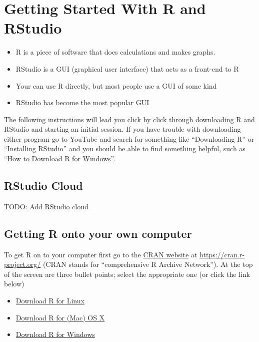 \documentclass[
]{book}
\providecommand{\tightlist}{%
  \setlength{\itemsep}{0pt}\setlength{\parskip}{0pt}}
\begin{document}
\hypertarget{getting-started-with-r-and-rstudio}{%
\section{Getting Started With R and RStudio}\label{getting-started-with-r-and-rstudio}}

\begin{itemize}
\tightlist
\item
  R is a piece of software that does calculations and makes graphs.
\item
  RStudio is a GUI (graphical user interface) that acts as a front-end to R
\item
  Your can use R directly, but most people use a GUI of some kind
\item
  RStudio has become the most popular GUI
\end{itemize}

The following instructions will lead you click by click through downloading R and RStudio and starting an initial session. If you have trouble with downloading either program go to YouTube and search for something like ``Downloading R'' or ``Installing RStudio'' and you should be able to find something helpful, such as \href{https://www.youtube.com/watch?v=GYdmkLgV9n8}{``How to Download R for Windows''}.

\hypertarget{rstudio-cloud}{%
\subsection{RStudio Cloud}\label{rstudio-cloud}}

TODO: Add RStudio cloud

\hypertarget{getting-r-onto-your-own-computer}{%
\subsection{Getting R onto your own computer}\label{getting-r-onto-your-own-computer}}

To get R on to your computer first go to the \href{https://cran.r-project.org/}{CRAN website} at \url{https://cran.r-project.org/} (CRAN stands for ``comprehensive R Archive Network''). At the top of the screen are three bullet points; select the appropriate one (or click the link below)

\begin{itemize}
\tightlist
\item
  \href{https://cran.r-project.org/bin/linux/}{Download R for Linux}
\item
  \href{https://cran.r-project.org/bin/macosx/}{Download R for (Mac) OS X}
\item
  \href{https://cran.r-project.org/bin/windows/}{Download R for Windows}
\end{itemize}
\end{document}

